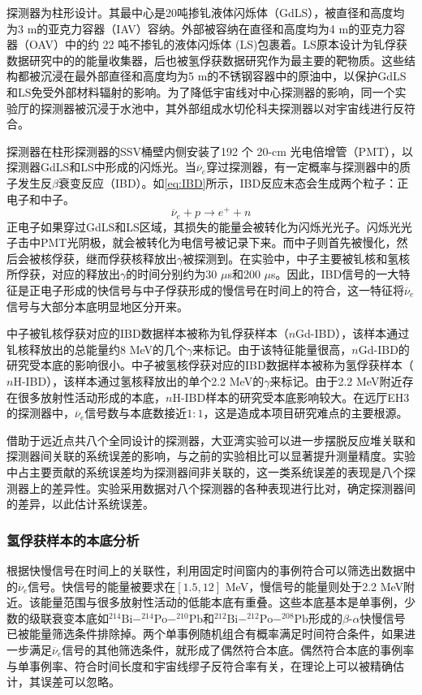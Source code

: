\documentclass[a4paper,zihao=-4]{article}
\begin{document}
探测器为柱形设计。其最中心是20吨掺钆液体闪烁体（GdLS），被直径和高度均为3 m的亚克力容器（IAV）容纳。外部被容纳在直径和高度均为4 m的亚克力容器（OAV）中的约 22 吨不掺钆的液体闪烁体 (LS)包裹着。LS原本设计为钆俘获数据研究中的的能量收集器，后也被氢俘获数据研究作为最主要的靶物质。这些结构都被沉浸在最外部直径和高度均为5 m的不锈钢容器中的原油中，以保护GdLS和LS免受外部材料辐射的影响。为了降低宇宙线对中心探测器的影响，同一个实验厅的探测器被沉浸于水池中，其外部组成水切伦科夫探测器以对宇宙线进行反符合。

探测器在柱形探测器的SSV桶壁内侧安装了192 个 20-cm 光电倍增管（PMT），以探测器GdLS和LS中形成的闪烁光。当$\overline{\nu}_e$穿过探测器，有一定概率与探测器中的质子发生反$\beta$衰变反应（IBD）。如\cref{eq:IBD}所示，IBD反应末态会生成两个粒子：正电子和中子。
\begin{equation}\label{eq:IBD}
	\overline{\nu}_e+p\to e^++n
\end{equation}
正电子如果穿过GdLS和LS区域，其损失的能量会被转化为闪烁光光子。闪烁光光子击中PMT光阴极，就会被转化为电信号被记录下来。而中子则首先被慢化，然后会被核俘获，继而俘获核释放出$\gamma$被探测到。在实验中，中子主要被钆核和氢核所俘获，对应的释放出$\gamma$的时间分别约为30 $\mu$s和200 $\mu$s。因此，IBD信号的一大特征是正电子形成的快信号与中子俘获形成的慢信号在时间上的符合，这一特征将$\overline{\nu}_e$信号与大部分本底明显地区分开来。

中子被钆核俘获对应的IBD数据样本被称为钆俘获样本（$n$Gd-IBD），该样本通过钆核释放出的总能量约8 MeV的几个$\gamma$来标记。由于该特征能量很高，$n$Gd-IBD的研究受本底的影响很小。中子被氢核俘获对应的IBD数据样本被称为氢俘获样本（$n$H-IBD），该样本通过氢核释放出的单个2.2 MeV的$\gamma$来标记。由于2.2 MeV附近存在很多放射性活动形成的本底，$n$H-IBD样本的研究受本底影响较大。在远厅EH3的探测器中，$\overline{\nu}_e$信号数与本底数接近$1:1$，这是造成本项目研究难点的主要根源。

借助于远近点共八个全同设计的探测器，大亚湾实验可以进一步摆脱反应堆关联和探测器间关联的系统误差的影响，与之前的实验相比可以显著提升测量精度。实验中占主要贡献的系统误差均为探测器间非关联的，这一类系统误差的表现是八个探测器上的差异性。实验采用数据对八个探测器的各种表现进行比对，确定探测器间的差异，以此估计系统误差。

\subsubsection{氢俘获样本的本底分析}\label{sec:backgrounds}
根据快慢信号在时间上的关联性，利用固定时间窗内的事例符合可以筛选出数据中的$\overline{\nu}_e$信号。快信号的能量被要求在$[1.5, 12]$ MeV，慢信号的能量则处于2.2 MeV附近。该能量范围与很多放射性活动的低能本底有重叠。这些本底基本是单事例，少数的级联衰变本底如$^{214}\text{Bi}-^{214}\text{Po}-^{210}\text{Pb}$和$^{212}\text{Bi}-^{212}\text{Po}-^{208}\text{Pb}$形成的$\beta$-$\alpha$快慢信号已被能量筛选条件排除掉。两个单事例随机组合有概率满足时间符合条件，如果进一步满足$\overline{\nu}_e$信号的其他筛选条件，就形成了偶然符合本底。偶然符合本底的事例率与单事例率、符合时间长度和宇宙线缪子反符合率有关，在理论上可以被精确估计，其误差可以忽略。
\end{document}
